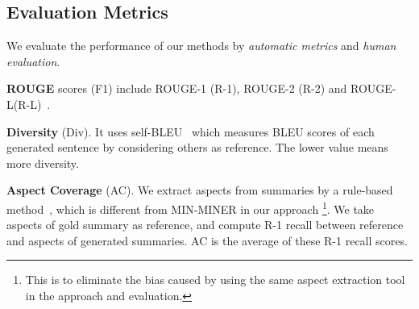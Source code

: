 

\subsection{Evaluation Metrics}
We evaluate the performance of our methods by {\em automatic metrics}
and {\em human evaluation}.


\textbf{ROUGE} scores (F1) include
ROUGE-1 (R-1), ROUGE-2 (R-2) and
ROUGE-L(R-L)~\cite{rouge}.


\textbf{Diversity} (Div). It uses self-BLEU~\cite{SelfBleu18}
which measures BLEU scores of each generated sentence by considering others as reference. 
The lower value means more diversity.

\textbf{Aspect Coverage} (AC).
We extract aspects from summaries 
by a rule-based method~\cite{aspect14},
which is different from MIN-MINER in our approach
\footnote{This is to eliminate the bias caused by using the same aspect extraction tool in the approach and evaluation.}.
We take aspects of gold summary as reference,
and compute R-1 recall between reference  
and aspects of generated summaries.
AC is the average of these R-1 recall scores.

